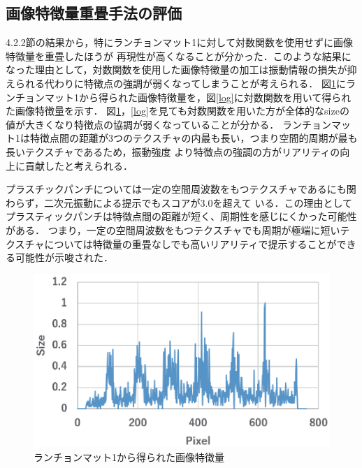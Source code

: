 \subsection{画像特徴量重畳手法の評価}
4.2.2節の結果から，特にランチョンマット1に対して対数関数を使用せずに画像特徴量を重畳したほうが
再現性が高くなることが分かった．このような結果になった理由として，対数関数を使用した画像特徴量の加工は振動情報の損失が抑えられる代わりに特徴点の強調が弱くなってしまうことが考えられる．
図\ref{kp}にランチョンマット1から得られた画像特徴量を，図\ref{log}に対数関数を用いて得られた画像特徴量を示す．
図\ref{kp}，\ref{log}を見ても対数関数を用いた方が全体的なsizeの値が大きくなり特徴点の協調が弱くなっていることが分かる．
ランチョンマット1は特徴点間の距離が3つのテクスチャの内最も長い，つまり空間的周期が最も長いテクスチャであるため，振動強度
より特徴点の強調の方がリアリティの向上に貢献したと考えられる．

プラスチックパンチについては一定の空間周波数をもつテクスチャであるにも関わらず，二次元振動による提示でもスコアが3.0を超えて
いる．この理由としてプラスティックパンチは特徴点間の距離が短く、周期性を感じにくかった可能性がある．
つまり，一定の空間周波数をもつテクスチャでも周期が極端に短いテクスチャについては特徴量の重畳なしでも高いリアリティで提示することができる可能性が示唆された．

\begin{figure}[h]
\begin{center}
  \includegraphics[width=15cm]{mat1_kp.eps}
  \caption{ランチョンマット1から得られた画像特徴量}
  \label{kp}
\end{center}
\end{figure}

